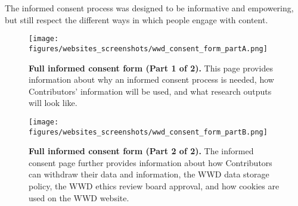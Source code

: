 The informed consent process was designed to be informative and empowering, but still respect the different ways in which people engage with content.


\begin{figure}[H]
    \centering
    \texttt{[image: figures/websites\_screenshots/wwd\_consent\_form\_partA.png]}
    \caption{\textbf{Full informed consent form (Part 1 of 2).} This page provides information about why an informed consent process is needed, how Contributors' information will be used, and what research outputs will look like.}
    \label{fig:full_consent_partA}
\end{figure}

\begin{figure}[H]
    \centering
    \texttt{[image: figures/websites\_screenshots/wwd\_consent\_form\_partB.png]}
    \caption{\textbf{Full informed consent form (Part 2 of 2).} The informed consent page further provides information about how Contributors can withdraw their data and information, the \textsc{WWD}  data storage policy, the \textsc{WWD}  ethics review board approval, and how cookies are used on the \textsc{WWD}   website.}
    \label{fig:full_consent_partB}
\end{figure}
